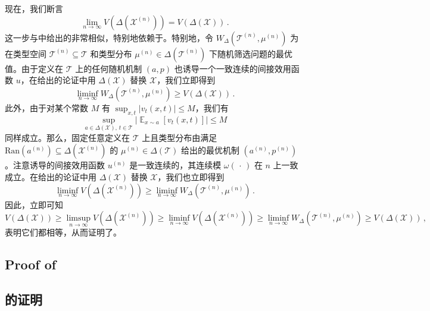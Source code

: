 \documentclass[12pt,letterpaper]{article}
\newenvironment{original}{\color{black}\noindent}{}
\newenvironment{translation}{\color{blue}\noindent}{}
\theoremstyle{plain}
\theoremstyle{definition}
\theoremstyle{remark}
\DeclareMathOperator{\E}{\mathds{E}}
\renewcommand{\1}{\mathds{1}}
\newcommand{\X}{\mathcal{X}}
\theoremstyle{definition}
\begin{document}
\begin{translation}
现在，我们断言
\[\lim_{n \rightarrow \infty} V(\Delta(\X^{(n)})) = V(\Delta(\X))\,.\]
这一步与中给出的非常相似，特别地依赖于。特别地，令 $W_{\Delta}(\mathcal{T}^{(n)}, \mu^{(n)})$ 为在类型空间 $\mathcal{T}^{(n)} \subseteq \mathcal{T}$ 和类型分布 $\mu^{(n)} \in \Delta(\mathcal{T}^{(n)})$ 下随机筛选问题的最优值。由于定义在 $\mathcal{T}$ 上的任何随机机制 $(a, p)$ 也诱导一个一致连续的间接效用函数 $u$，在给出的论证中用 $\Delta(\X)$ 替换 $\X$，我们立即得到
\[\liminf_{n\rightarrow\infty} W_\Delta(\mathcal{T}^{(n)}, \mu^{(n)}) \geq  V(\Delta(\X)) \,.\]
此外，由于对某个常数 $M$ 有 $\sup_{x, t}|v_t(x, t)| \leq M$，我们有
\[\sup_{a \in \Delta(\X),\, t \in \mathcal{T}} \big|\E_{x \sim a}[v_t(x, t)]\big| \leq M \]
同样成立。那么，固定任意定义在 $\mathcal{T}$ 上且类型分布由满足 $\text{Ran}(a^{(n)}) \subseteq \Delta(\X^{(n)})$ 的 $\mu^{(n)} \in \Delta(\mathcal{T})$ 给出的最优机制 $(a^{(n)}, p^{(n)})$。注意诱导的间接效用函数 $u^{(n)}$ 是一致连续的，其连续模 $\omega(\,\cdot\,)$ 在 $n$ 上一致成立。在给出的论证中用 $\Delta(\X)$ 替换 $\X$，我们也立即得到
\[\liminf_{n \rightarrow \infty} V(\Delta(\X^{(n)})) \geq \liminf_{n\rightarrow\infty} W_\Delta(\mathcal{T}^{(n)}, \mu^{(n)})\,.\]
因此，立即可知
\[V(\Delta(\X)) \geq \limsup_{n \rightarrow \infty} V(\Delta(\X^{(n)})) \geq \liminf_{n \rightarrow \infty} V(\Delta(\X^{(n)})) \geq \liminf_{n\rightarrow\infty} W_\Delta(\mathcal{T}^{(n)}, \mu^{(n)}) \geq  V(\Delta(\X)) \,,\]
表明它们都相等，从而证明了。
\end{translation}

\begin{original}
\subsection{Proof of }
\end{original}
\begin{translation}
\subsection{的证明}
\end{translation}
\end{document}
